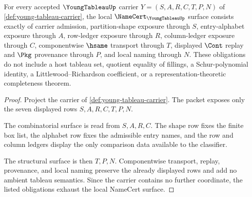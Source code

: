 \begin{theorem}
\label{thm:young-tableau-namecert-obligations}
For every accepted $\YoungTableauUp$ carrier $Y=(S,A,R,C,T,P,N)$ of \autoref{def:young-tableau-carrier}, the local $\NameCert_{\YoungTableauUp}$ surface consists exactly of carrier admission, partition-shape exposure through $S$, entry-alphabet exposure through $A$, row-ledger exposure through $R$, column-ledger exposure through $C$, componentwise $\hsame$ transport through $T$, displayed $\Cont$ replay and $\Pkg$ provenance through $P$, and local naming through $N$. These obligations do not include a host tableau set, quotient equality of fillings, a Schur-polynomial identity, a Littlewood--Richardson coefficient, or a representation-theoretic completeness theorem.
\end{theorem}
\begin{proof}
Project the carrier of \autoref{def:young-tableau-carrier}. The packet exposes only the seven displayed rows $S,A,R,C,T,P,N$.

The combinatorial surface is read from $S,A,R,C$. The shape row fixes the finite box list, the alphabet row fixes the admissible entry names, and the row and column ledgers display the only comparison data available to the classifier.

The structural surface is then $T,P,N$. Componentwise transport, replay, provenance, and local naming preserve the already displayed rows and add no ambient tableau semantics. Since the carrier contains no further coordinate, the listed obligations exhaust the local NameCert surface.
\end{proof}

